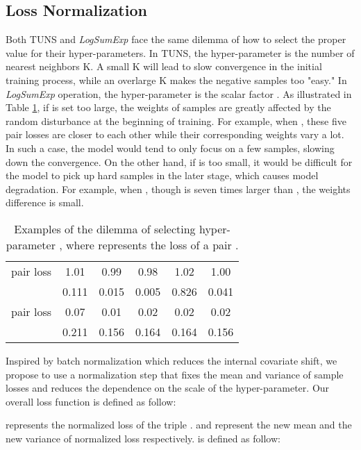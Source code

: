 \documentclass[sigconf]{acmart}
\begin{document}
\subsection{Loss Normalization}
Both TUNS and \emph{LogSumExp} face the same dilemma of how to select the proper value for their hyper-parameters.
In TUNS, the hyper-parameter is the number of nearest neighbors K.
A small K will lead to slow convergence in the initial training process, while an overlarge K makes the negative samples too "easy."
In \emph{LogSumExp} operation, the hyper-parameter is the scalar factor .
As illustrated in Table \ref{dilemma}, if  is set too large, the weights of samples are greatly affected by the random disturbance at the beginning of training.
For example, when , these five pair losses are closer to each other while their corresponding weights vary a lot.
In such a case, the model would tend to only focus on a few samples, slowing down the convergence.
On the other hand, if  is too small, it would be difficult for the model to pick up hard samples in the later stage, which causes model degradation.
For example, when , though  is seven times larger than , the weights difference is small.

\begin{table}
\begin{center}
\renewcommand\arraystretch{1.1}
\begin{tabular}{cccccc}
\toprule
&&&&&\\
\toprule
pair loss&1.01&0.99&0.98&1.02&1.00\\
&0.111&0.015&0.005&0.826&0.041\\
\toprule
pair loss&0.07&0.01&0.02&0.02&0.02\\
&0.211&0.156&0.164&0.164&0.156\\
\bottomrule
\end{tabular}
\caption{Examples of the dilemma of selecting hyper-parameter , where  represents the loss of a pair .} \label{dilemma}
\end{center}
\end{table}

Inspired by batch normalization \cite{DBLP:conf/icml/IoffeS15} which reduces the internal covariate shift, we propose to use a normalization step that fixes the mean and variance of sample losses and reduces the dependence on the scale of the hyper-parameter.
Our overall loss function is defined as follow:



 represents the normalized loss of the triple .
 and  represent the new mean and the new variance of normalized loss respectively.
 is defined as follow:
\end{document}
